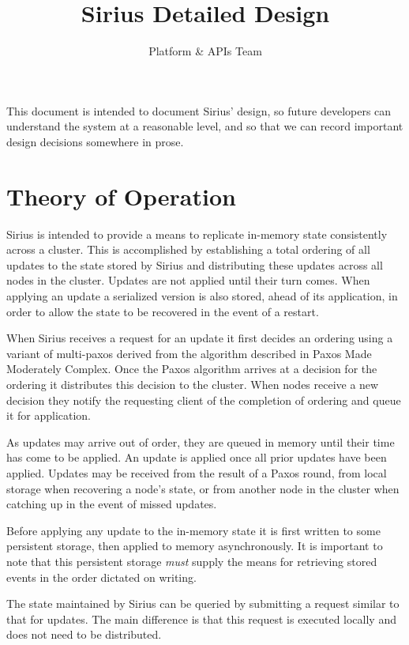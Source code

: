 \documentclass[11pt]{article}
\begin{document}
\title{Sirius Detailed Design}
\author{Platform \& APIs Team}
\maketitle

This document is intended to document Sirius’ design, so future developers can understand the system at a reasonable level, and so that we can record important design decisions somewhere in prose.

\section{Theory of Operation}
Sirius is intended to provide a means to replicate in-memory state consistently
across a cluster. This is accomplished by establishing a total ordering of all
updates to the state stored by Sirius and distributing these updates across all
nodes in the cluster. Updates are not applied until their turn comes. When
applying an update a serialized version is also stored, ahead of its
application, in order to allow the state to be recovered in the event of a
restart.

When Sirius receives a request for an update it first decides an ordering using
a variant of multi-paxos derived from the algorithm described in Paxos Made     %
Moderately Complex. Once the Paxos algorithm arrives at a decision for the
ordering it distributes this decision to the cluster.  When nodes receive a new
decision they notify the requesting client of the completion of ordering and
queue it for application.

As updates may arrive out of order, they are queued in memory until their time
has come to be applied.  An update is applied once all prior updates have been applied.
Updates may be received from the result of a Paxos round, from local storage
when recovering a node's state, or from another node in the cluster when
catching up in the event of missed updates.

Before applying any update to the in-memory state it is first written to some
persistent storage, then applied to memory asynchronously. It is important to
note that this persistent storage {\em must} supply the means for retrieving
stored events in the order dictated on writing.

The state maintained by Sirius can be queried by submitting a request similar
to that for updates.  The main difference is that this request is executed
locally and does not need to be distributed.
\end{document}
